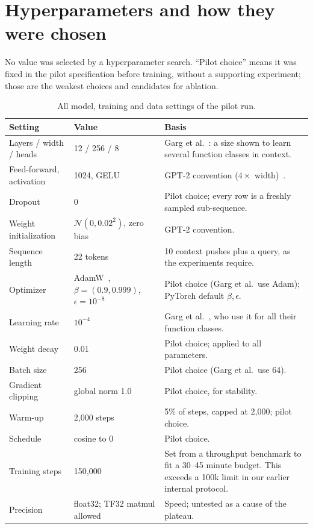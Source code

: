 \documentclass{article}
\begin{document}
\section{Hyperparameters and how they were chosen}\label{app:hp}
No value was selected by a hyperparameter search. ``Pilot choice'' means it was fixed in the pilot specification before training, without a supporting experiment; those are the weakest choices and candidates for ablation.
\begin{table}[ht]
\centering\small
\caption{All model, training and data settings of the pilot run.}
\label{tab:hp}
\begin{tabular}{>{\raggedright}p{3.2cm}>{\raggedright}p{3.0cm}p{6.4cm}}
\toprule
Setting & Value & Basis\\
\midrule
Layers / width / heads & 12 / 256 / 8 & Garg et al.~\cite{garg2022}: a size shown to learn several function classes in context.\\
Feed-forward, activation & 1024, GELU & GPT-2 convention ($4\times$ width)~\cite{radford2019}.\\
Dropout & 0 & Pilot choice; every row is a freshly sampled sub-sequence.\\
Weight initialization & $\mathcal N(0,0.02^2)$, zero bias & GPT-2 convention.\\
Sequence length & 22 tokens & 10 context pushes plus a query, as the experiments require.\\
Optimizer & AdamW~\cite{loshchilov2017}, $\beta=(0.9,0.999)$, $\epsilon=10^{-8}$ & Pilot choice (Garg et al.\ use Adam); PyTorch default $\beta,\epsilon$.\\
Learning rate & $10^{-4}$ & Garg et al.~\cite{garg2022}, who use it for all their function classes.\\
Weight decay & 0.01 & Pilot choice; applied to all parameters.\\
Batch size & 256 & Pilot choice (Garg et al.\ use 64).\\
Gradient clipping & global norm 1.0 & Pilot choice, for stability.\\
Warm-up & 2,000 steps & 5\% of steps, capped at 2,000; pilot choice.\\
Schedule & cosine to 0 & Pilot choice.\\
Training steps & 150,000 & Set from a throughput benchmark to fit a 30--45 minute budget. This exceeds a 100k limit in our earlier internal protocol.\\
Precision & float32; TF32 matmul allowed & Speed; untested as a cause of the plateau.\\

\end{tabular}
\end{table}
\end{document}
